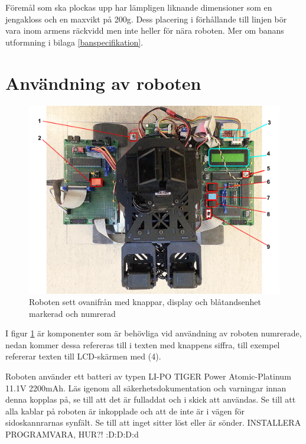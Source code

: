 \documentclass[a4paper,12pt]{article}
\begin{document}
Föremål som ska plockas upp har lämpligen liknande dimensioner som en jengakloss och en maxvikt på 200g. Dess placering i förhållande till linjen bör vara inom armens räckvidd men inte heller för nära roboten. Mer om banans utformning i bilaga \ref{banspecifikation}.  

%
%

\section{Användning av roboten}
\begin{figure}[H]
	\centering
	\includegraphics[width=1.0\textwidth]{oversikt_handledning.pdf}
	\caption{Roboten sett ovanifrån med knappar, display och blåtandsenhet markerad och numrerad}
	\label{fig:robot_oversikt}
\end{figure}

I figur \ref{fig:robot_oversikt} är komponenter som är behövliga vid användning av roboten numrerade, nedan kommer dessa refereras till i texten med knappens siffra, till exempel refererar texten till LCD-skärmen med (4).

Roboten använder ett batteri av typen LI-PO TIGER Power Atomic-Platinum 11.1V 2200mAh. Läs igenom all säkerhetsdokumentation och varningar innan denna kopplas på, se till att det är fulladdat och i skick att användas. Se till att alla kablar på roboten är inkopplade och att de inte är i vägen för sidoskannrarnas synfält. Se till att inget sitter löst eller är sönder. INSTALLERA PROGRAMVARA, HUR?! :D:D:D:d
\end{document}
